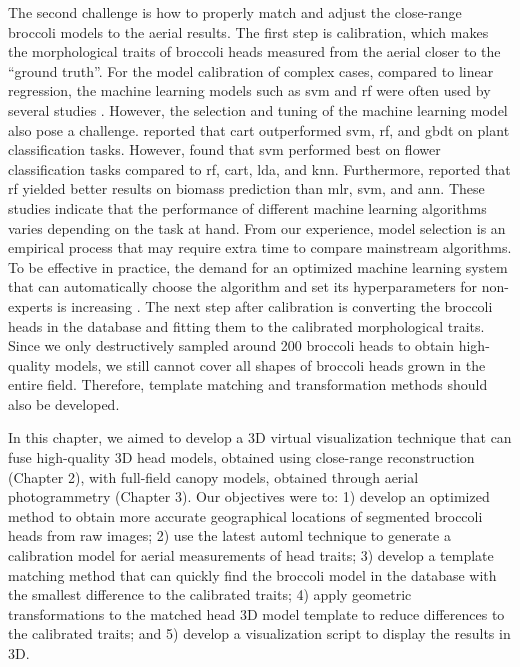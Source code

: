 The second challenge is how to properly match and adjust the close-range broccoli models to the aerial results. The first step is calibration, which makes the morphological traits of broccoli heads measured from the aerial closer to the ``ground truth''. For the model calibration of complex cases, compared to linear regression, the machine learning models such as \gls{svm} and \gls{rf} were often used by several studies \citep{nguyen_uav_2023, lu_assessment_2022}. However, the selection and tuning of the machine learning model also pose a challenge. \citet{wang_landscape_2019} reported that \gls{cart} outperformed \gls{svm}, \gls{rf}, and \gls{gbdt} on plant classification tasks. However, \citet{han_drone_2021} found that \gls{svm} performed best on flower classification tasks compared to \gls{rf}, \gls{cart}, \gls{lda}, and \gls{knn}. Furthermore, \citet{han_modeling_2019} reported that \gls{rf} yielded better results on biomass prediction than \gls{mlr}, \gls{svm}, and \gls{ann}. These studies indicate that the performance of different machine learning algorithms varies depending on the task at hand. From our experience, model selection is an empirical process that may require extra time to compare mainstream algorithms. To be effective in practice, the demand for an optimized machine learning system that can automatically choose the algorithm and set its hyperparameters for non-experts is increasing \citep{feurer_efficient_2015}. The next step after calibration is converting the broccoli heads in the database and fitting them to the calibrated morphological traits. Since we only destructively sampled around 200 broccoli heads to obtain high-quality models, we still cannot cover all shapes of broccoli heads grown in the entire field. Therefore, template matching and transformation methods should also be developed.

In this chapter, we aimed to develop a 3D virtual visualization technique that can fuse high-quality 3D head models, obtained using close-range reconstruction (Chapter 2), with full-field canopy models, obtained through aerial photogrammetry (Chapter 3). Our objectives were to: 1) develop an optimized method to obtain more accurate geographical locations of segmented broccoli heads from raw images; 2) use the latest \gls{automl} technique to generate a calibration model for aerial measurements of head traits; 3) develop a template matching method that can quickly find the broccoli model in the database with the smallest difference to the calibrated traits; 4) apply geometric transformations to the matched head 3D model template to reduce differences to  the calibrated traits; and 5) develop a visualization script to display the results in 3D.

